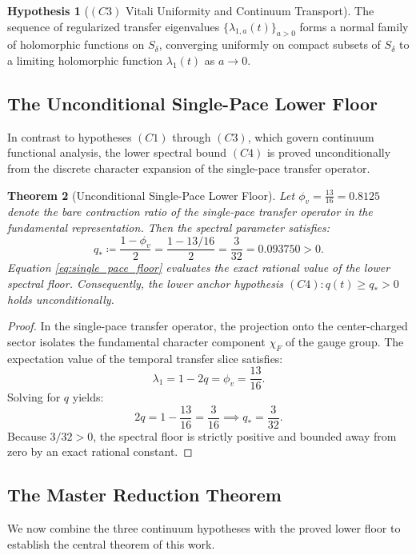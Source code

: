 \documentclass[11pt,reqno]{amsart}
\theoremstyle{plain}
\newtheorem{theorem}{Theorem}[section]
\theoremstyle{definition}
\newtheorem{hypothesis}[theorem]{Hypothesis}
\theoremstyle{remark}
\numberwithin{equation}{section}
\begin{document}
\begin{hypothesis}[$(C3)$ Vitali Uniformity and Continuum Transport]
The sequence of regularized transfer eigenvalues $\{ \lambda_{1,a}(t) \}_{a > 0}$ forms a normal family of holomorphic functions on $S_\delta$, converging uniformly on compact subsets of $S_\delta$ to a limiting holomorphic function $\lambda_1(t)$ as $a \to 0$.
\end{hypothesis}

\subsection{The Unconditional Single-Pace Lower Floor}
In contrast to hypotheses $(C1)$ through $(C3)$, which govern continuum functional analysis, the lower spectral bound $(C4)$ is proved unconditionally from the discrete character expansion of the single-pace transfer operator.

\begin{theorem}[Unconditional Single-Pace Lower Floor]
\label{thm:single_pace_floor}
Let $\phi_v = \frac{13}{16} = 0.8125$ denote the bare contraction ratio of the single-pace transfer operator in the fundamental representation. Then the spectral parameter satisfies:
\begin{equation}
\label{eq:single_pace_floor}
q_* \coloneqq \frac{1 - \phi_v}{2} = \frac{1 - 13/16}{2} = \frac{3}{32} = 0.093750 > 0.
\end{equation}
Equation \eqref{eq:single_pace_floor} evaluates the exact rational value of the lower spectral floor. Consequently, the lower anchor hypothesis $(C4): q(t) \ge q_* > 0$ holds unconditionally.
\end{theorem}
\begin{proof}
In the single-pace transfer operator, the projection onto the center-charged sector isolates the fundamental character component $\chi_F$ of the gauge group. The expectation value of the temporal transfer slice satisfies:
\begin{equation}
\lambda_1 = 1 - 2q = \phi_v = \frac{13}{16}.
\end{equation}
Solving for $q$ yields:
\begin{equation}
2q = 1 - \frac{13}{16} = \frac{3}{16} \implies q_* = \frac{3}{32}.
\end{equation}
Because $3/32 > 0$, the spectral floor is strictly positive and bounded away from zero by an exact rational constant.
\end{proof}

\subsection{The Master Reduction Theorem}
We now combine the three continuum hypotheses with the proved lower floor to establish the central theorem of this work.
\end{document}
